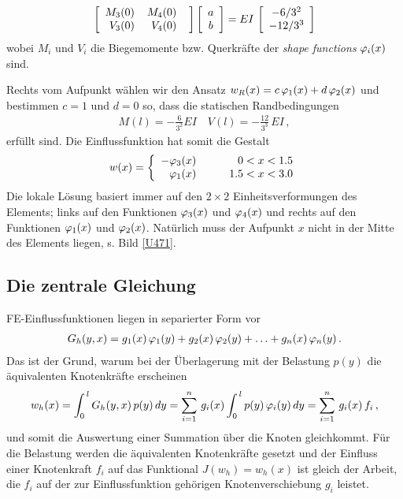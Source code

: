 \begin{align}
\left[ \barr {r @{\hspace{4mm}}r @{\hspace{4mm}}r
@{\hspace{4mm}}r @{\hspace{4mm}}r}
      M_3(0) & M_4(0)  \\
      V_3(0) & V_4(0) \\
     \earr \right]\left [\barr{c}  a \\ b\earr \right ]
=  EI\,\left [\barr{c}  -6/3^2 \\  -12/3^3\earr \right ]
\end{align}
wobei $M_i$ und $V_i$ die Biegemomente bzw. Querkr\"{a}fte der {\em shape functions\/} $\Np_i(x)$ sind.

Rechts vom Aufpunkt w\"{a}hlen wir den Ansatz $w_R(x) = c\,\Np_1(x) + d\,\Np_2(x)$ und bestimmen $c = 1$ und $d = 0$ so, dass die statischen Randbedingungen
\begin{align}
M(l) = - \frac{6}{3^2} EI  \quad V(l) = - \frac{12}{3^3}\,EI\,,
\end{align}
erf\"{u}llt sind. Die Einflussfunktion hat somit die Gestalt
\begin{align}
w(x) = \left \{ \barr{r r} -\Np_3(x)  \qquad &0 < x < 1.5\\ \Np_1(x) \qquad &1.5 < x < 3.0 \earr \right.
\end{align}
Die lokale L\"{o}sung  basiert immer auf den $2 \times 2$ Einheitsverformungen des Elements; links auf den Funktionen $\Np_3(x)$ und $\Np_4(x)$ und rechts auf den Funktionen $\Np_1(x)$ und $\Np_2(x)$. Nat\"{u}rlich muss der Aufpunkt $x$ nicht in der Mitte des Elements liegen, s. Bild \ref{U471}.

{\textcolor{sectionTitleBlue}{\section{Die zentrale Gleichung}}}
FE-Einflussfunktionen liegen in separierter Form vor
\begin{align}
G_h(y,x) = g_1(x)\,\Np_1(y) + g_2(x)\,\Np_2(y) + \ldots + g_n(x)\,\Np_n(y)\,.
\end{align}
Das ist der Grund, warum bei der \"{U}berlagerung mit der Belastung $p(y)$ die \"{a}quivalenten Knotenkr\"{a}fte erscheinen
\begin{align}
w_h(x) = \int_0^{\,l} G_h(y,x)\,p(y)\,dy = \sum_{i = 1}^n\,g_i(x) \int_0^{\,l} p(y)\,\Np_i(y)\,dy = \sum_{i = 1}^n\,g_i(x)\,f_i\,,
\end{align}
und somit die Auswertung einer  Summation \"{u}ber die Knoten gleichkommt. F\"{u}r die Belastung werden die \"{a}quivalenten Knotenkr\"{a}fte gesetzt und der Einfluss einer Knotenkraft $f_i$ auf das Funktional $J(w_h) = w_h(x)$ ist gleich der Arbeit, die $f_i$ auf der zur Einflussfunktion geh\"{o}rigen Knotenverschiebung $g_i $ leistet.

